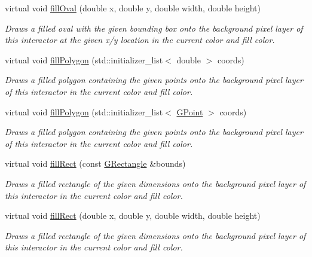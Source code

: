 \begin{DoxyCompactItemize}
virtual void \mbox{\hyperlink{classGDrawingSurface_a28c700c82f31cd328a4629273420ee61}{fill\+Oval}} (double x, double y, double width, double height)
\begin{DoxyCompactList}\small\item\em Draws a filled oval with the given bounding box onto the background pixel layer of this interactor at the given x/y location in the current color and fill color. \end{DoxyCompactList}\item 
virtual void \mbox{\hyperlink{classGDrawingSurface_a15f8c1c4409ef51c1a30a92a195b8f66}{fill\+Polygon}} (std\+::initializer\+\_\+list$<$ double $>$ coords)
\begin{DoxyCompactList}\small\item\em Draws a filled polygon containing the given points onto the background pixel layer of this interactor in the current color and fill color. \end{DoxyCompactList}\item 
virtual void \mbox{\hyperlink{classGDrawingSurface_a31822d59786156ebf1cc3b2f7fb70330}{fill\+Polygon}} (std\+::initializer\+\_\+list$<$ \mbox{\hyperlink{structGPoint}{G\+Point}} $>$ coords)
\begin{DoxyCompactList}\small\item\em Draws a filled polygon containing the given points onto the background pixel layer of this interactor in the current color and fill color. \end{DoxyCompactList}\item 
virtual void \mbox{\hyperlink{classGDrawingSurface_ae6582295003bf2488836b1993dadbad7}{fill\+Rect}} (const \mbox{\hyperlink{structGRectangle}{G\+Rectangle}} \&bounds)
\begin{DoxyCompactList}\small\item\em Draws a filled rectangle of the given dimensions onto the background pixel layer of this interactor in the current color and fill color. \end{DoxyCompactList}\item 
virtual void \mbox{\hyperlink{classGDrawingSurface_aac3ae7d3aee950de78eca0e108352254}{fill\+Rect}} (double x, double y, double width, double height)
\begin{DoxyCompactList}\small\item\em Draws a filled rectangle of the given dimensions onto the background pixel layer of this interactor in the current color and fill color. \end{DoxyCompactList}\item 

\end{DoxyCompactItemize}
